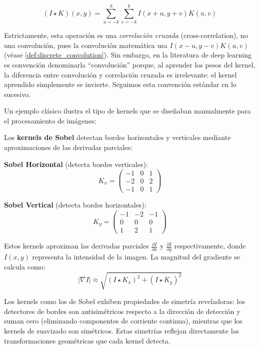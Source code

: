 \begin{equation}
    (I \star K)(x,y) = \sum_{u=-k}^{k}\sum_{v=-k}^{k} I(x+u, y+v)K(u,v)
    \label{eq:convolution2d}
\end{equation}

Estrictamente, esta operación es una \textit{correlación cruzada} (cross-correlation), no una convolución, pues la convolución matemática usa $I(x-u, y-v)K(u,v)$ (véase \autoref{def:discrete_convolution}). Sin embargo, en la literatura de deep learning es convención denominarla ``convolución'' porque, al aprender los pesos del kernel, la diferencia entre convolución y correlación cruzada es irrelevante: el kernel aprendido simplemente se invierte. Seguimos esta convención estándar en lo sucesivo.

Un ejemplo clásico ilustra el tipo de kernels que se diseñaban manualmente para el procesamiento de imágenes:

\begin{example}\label{ex:kernel_sobel}
Los \textbf{kernels de Sobel} detectan bordes horizontales y verticales mediante aproximaciones de las derivadas parciales:

\textbf{Sobel Horizontal} (detecta bordes verticales):
\[
K_x = \begin{pmatrix}
-1 & 0 & 1 \\
-2 & 0 & 2 \\
-1 & 0 & 1
\end{pmatrix}
\]

\textbf{Sobel Vertical} (detecta bordes horizontales):
\[
K_y = \begin{pmatrix}
-1 & -2 & -1 \\
0 & 0 & 0 \\
1 & 2 & 1
\end{pmatrix}
\]

Estos kernels aproximan las derivadas parciales $\frac{\partial I}{\partial x}$ y $\frac{\partial I}{\partial y}$ respectivamente, donde $I(x,y)$ representa la intensidad de la imagen. La magnitud del gradiente se calcula como:
\[
|\nabla I| \approx \sqrt{(I \star K_x)^2 + (I \star K_y)^2}
\]
\end{example}

Los kernels como los de Sobel exhiben propiedades de simetría reveladoras: los detectores de bordes son antisimétricos respecto a la dirección de detección y suman cero (eliminando componentes de corriente continua), mientras que los kernels de suavizado son simétricos. Estas simetrías reflejan directamente las transformaciones geométricas que cada kernel detecta.

